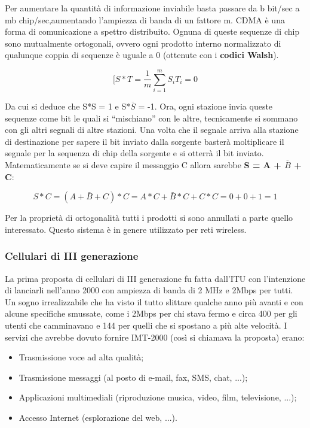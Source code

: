 Per aumentare la quantità di informazione inviabile basta passare da b bit/sec a mb chip/sec,aumentando l'ampiezza di banda di un fattore m. CDMA è una forma di comunicazione a spettro distribuito. Ognuna di queste sequenze di chip sono mutualmente ortogonali, ovvero ogni prodotto interno normalizzato di qualunque coppia di sequenze è uguale a 0 (ottenute con i \textbf{codici Walsh}). 

$$[ S*T = \frac{1}{m}\sum\limits_{i=1}^m S_i T_i = 0$$

Da cui si deduce che S*S = 1 e S*\(\overline{S}\) = -1. 
Ora, ogni stazione invia queste sequenze come bit le quali si ``mischiano'' con le altre, tecnicamente si sommano con gli altri segnali di altre stazioni. Una volta che il segnale arriva alla stazione di destinazione per sapere il bit inviato dalla sorgente basterà moltiplicare il segnale per la sequenza di chip della sorgente e si otterrà il bit inviato.
Matematicamente se si deve capire il messaggio C allora sarebbe \textbf{S = A + \(\overline{B}\) + C}:

\[S*C = (A+ \bar{B} + C)*C = A*C + \bar{B}*C + C*C = 0 + 0 + 1 = 1\]

Per la proprietà di ortogonalità tutti i prodotti si sono annullati a parte quello interessato. Questo sistema è in genere utilizzato per reti wireless.

\subsubsection{Cellulari di III generazione}

La prima proposta di cellulari di III generazione fu fatta dall'ITU con l'intenzione di lanciarli nell'anno 2000 con ampiezza di banda di 2 MHz e 2Mbps per tutti. Un sogno irrealizzabile che ha visto il tutto slittare qualche anno più avanti e con alcune specifiche smussate, come i 2Mbps per chi stava fermo e circa 400 per gli utenti che camminavano e 144 per quelli che si spostano a più alte velocità. I servizi che avrebbe dovuto fornire IMT-2000 (così si chiamava la proposta) erano:

\begin{itemize}

\item Trasmissione voce ad alta qualità;
\item Trasmissione messaggi (al posto di e-mail, fax, SMS, chat, ...);
\item Applicazioni multimediali (riproduzione musica, video, film, televisione, ...);
\item Accesso Internet (esplorazione del web, ...).

\end{itemize}


